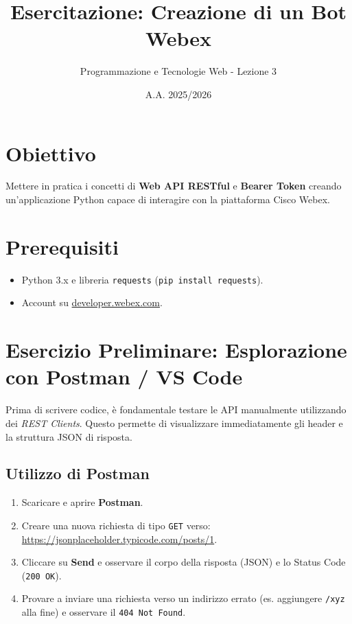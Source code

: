 \documentclass[11pt,a4paper]{article}
\title{\textbf{\color{primary} Esercitazione: Creazione di un Bot Webex}}
\author{Programmazione e Tecnologie Web - Lezione 3}
\date{A.A. 2025/2026}
\begin{document}
\maketitle

\section{Obiettivo}
Mettere in pratica i concetti di \textbf{Web API RESTful} e \textbf{Bearer Token} creando un'applicazione Python capace di interagire con la piattaforma Cisco Webex.

\section{Prerequisiti}
\begin{itemize}
    \item Python 3.x e libreria \texttt{requests} (\texttt{pip install requests}).
    \item Account su \href{https://developer.webex.com/}{developer.webex.com}.
\end{itemize}

\section{Esercizio Preliminare: Esplorazione con Postman / VS Code}
Prima di scrivere codice, è fondamentale testare le API manualmente utilizzando dei \textit{REST Clients}. Questo permette di visualizzare immediatamente gli header e la struttura JSON di risposta.

\subsection{Utilizzo di Postman}
\begin{enumerate}
    \item Scaricare e aprire \textbf{Postman}.
    \item Creare una nuova richiesta di tipo \texttt{GET} verso: \url{https://jsonplaceholder.typicode.com/posts/1}.
    \item Cliccare su \textbf{Send} e osservare il corpo della risposta (JSON) e lo Status Code (\texttt{200 OK}).
    \item Provare a inviare una richiesta verso un indirizzo errato (es. aggiungere \texttt{/xyz} alla fine) e osservare il \texttt{404 Not Found}.
\end{enumerate}
\end{document}
